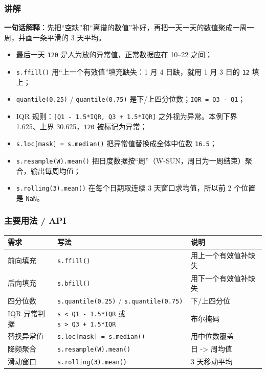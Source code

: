 \subsubsection{讲解}\label{ux8bb2ux89e3-19}

\textbf{一句话解释}：先把``空缺''和``离谱的数值''补好，再把一天一天的数值聚成一周一周，并画一条平滑的
3 天平均。

\begin{itemize}
\tightlist
\item
  最后一天 \texttt{120} 是人为放的异常值，正常数据应在 10--22 之间；
\item
  \texttt{s.ffill()} 用``上一个有效值''填充缺失：1 月 4 日缺，就用 1 月
  3 日的 \texttt{12} 填上；
\item
  \texttt{quantile(0.25)} / \texttt{quantile(0.75)}
  是下/上四分位数；\texttt{IQR\ =\ Q3\ -\ Q1}；
\item
  IQR 规则：\texttt{{[}Q1\ -\ 1.5*IQR,\ Q3\ +\ 1.5*IQR{]}}
  之外视为异常。本例下界 1.625、上界 30.625，\texttt{120} 被标记为异常；
\item
  \texttt{s.loc{[}mask{]}\ =\ s.median()} 把异常值替换成全体中位数
  \texttt{16.5}；
\item
  \texttt{s.resample(\textquotesingle{}W\textquotesingle{}).mean()}
  把日度数据按``周''（W-SUN，周日为一周结束）聚合，输出每周均值；
\item
  \texttt{s.rolling(3).mean()} 在每个日期取连续 3 天窗口求均值，所以前 2
  个位置是 \texttt{NaN}。
\end{itemize}

\subsubsection{主要用法 / API}\label{ux4e3bux8981ux7528ux6cd5-api-19}

{\def\LTcaptype{none} %
\begin{longtable}[]{@{}lll@{}}
\toprule\noalign{}
需求 & 写法 & 说明 \\
\midrule\noalign{}
\endhead
\bottomrule\noalign{}
\endlastfoot
前向填充 & \texttt{s.ffill()} & 用上一个有效值补缺失 \\
后向填充 & \texttt{s.bfill()} & 用下一个有效值补缺失 \\
四分位数 & \texttt{s.quantile(0.25)} / \texttt{s.quantile(0.75)} &
下/上四分位 \\
IQR 异常判据 & \texttt{s\ \textless{}\ Q1\ -\ 1.5*IQR} 或
\texttt{s\ \textgreater{}\ Q3\ +\ 1.5*IQR} & 布尔掩码 \\
替换异常值 & \texttt{s.loc{[}mask{]}\ =\ s.median()} & 用中位数覆盖 \\
降频聚合 &
\texttt{s.resample(\textquotesingle{}W\textquotesingle{}).mean()} & 日
-\textgreater{} 周均值 \\
滑动窗口 & \texttt{s.rolling(3).mean()} & 3 天移动平均 \\
\end{longtable}
}

